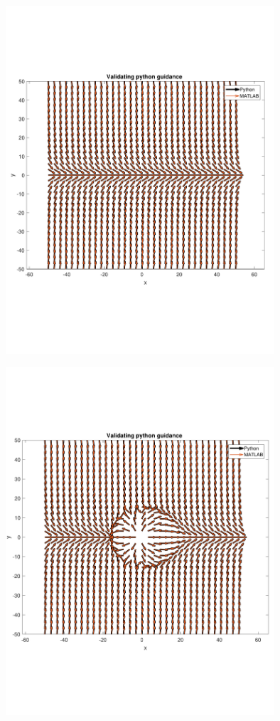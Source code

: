 \documentclass[numbered,pdftex]{ohio-etd}
\begin{document}
\begin{figure}
	\centering
	\includegraphics[trim=0 160 0 160,clip,width=10cm]{PaperFigures/Methods/resultsPython/PathConfirm}
	\caption{}
	\label{fig:dubinspaths}
\end{figure}


\begin{figure}
	\centering
	\includegraphics[trim=0 140 0 140,clip,width=10cm]{PaperFigures/Methods/resultsPython/summedFields}
	\caption{}
	\label{fig:dubinspaths}
\end{figure}
\end{document}
